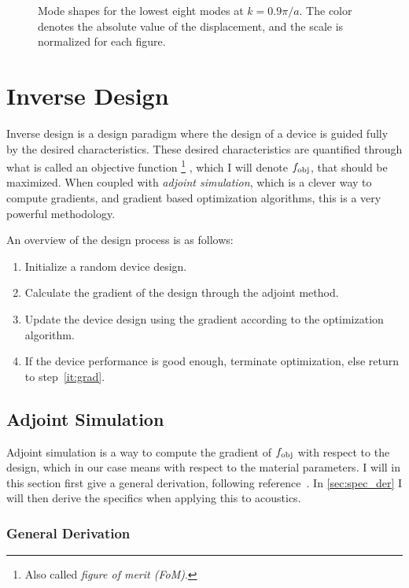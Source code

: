 \begin{figure}[htpb]
	\caption{%
		Mode shapes for the lowest eight modes at $k=0.9 \pi / a$.
		The color denotes the absolute value of the displacement,
		and the scale is normalized for each figure.
	}%
	\label{fig:modeshapes}
\end{figure}

\chapter{Inverse Design}

Inverse design is a design paradigm where the design of a device is guided fully by
the desired characteristics.
These desired characteristics are quantified through what is called an objective
function%
\footnote{Also called \emph{figure of merit (FoM)}.}%
, which I will denote $f_\text{obj}$,
that should be maximized.
When coupled with \emph{adjoint simulation}, which is a clever way to compute
gradients, and gradient based optimization
algorithms, this is a very powerful methodology.

An overview of the design process is as follows:
\begin{enumerate}
	\item Initialize a random device design.
	\item\label{it:grad} Calculate the gradient of the design through the adjoint method.
	\item Update the device design using the gradient according to the optimization algorithm.
	\item If the device performance is good enough, terminate optimization, else
		return to step~\ref{it:grad}.
\end{enumerate}

\section{Adjoint Simulation}

Adjoint simulation is a way to compute the gradient of $f_\text{obj}$ with respect to
the design, which in our case means with respect to the material parameters.
I will in this section first give a general derivation, following
reference~\cite{giles_introduction_2000}.
In \cref{sec:spec_der} I will then derive the specifics when applying this to
acoustics.

\subsection{General Derivation}\label{sec:general_derivation}

